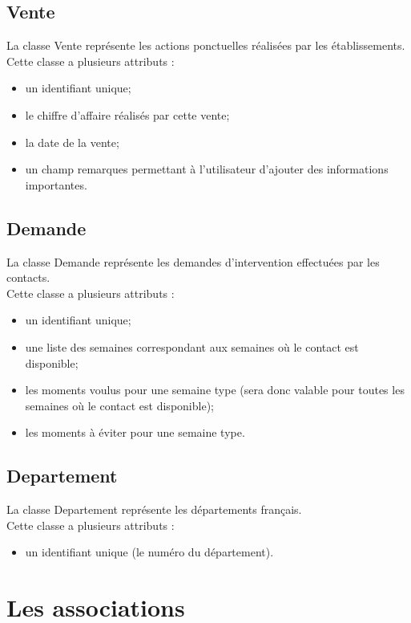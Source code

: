 \documentclass[asi, sansVersion]{picInsa}
\begin{document}
\subsection*{Vente}
La classe Vente représente les actions ponctuelles réalisées par les établissements.\\ 
Cette classe a plusieurs attributs : 
\begin{itemize}
\item un identifiant unique; 
\item le chiffre d'affaire réalisés par cette vente;
\item la date de la vente;
\item un champ remarques permettant à l'utilisateur d'ajouter des informations importantes. 
\end{itemize}

\subsection*{Demande}

La classe Demande représente les demandes d'intervention effectuées par les contacts.\\
Cette classe a plusieurs attributs :
\begin{itemize}
\item un identifiant unique; 
\item une liste des semaines correspondant aux semaines où le contact est disponible; 
\item les moments voulus pour une semaine type (sera donc valable pour toutes les semaines où le contact est disponible);
\item les moments à éviter pour une semaine type. 
\end{itemize}

\subsection*{Departement}

La classe Departement représente les départements français.\\
Cette classe a plusieurs attributs :
\begin{itemize}
\item un identifiant unique (le numéro du département). 
\end{itemize}


\section{Les associations}
\end{document}
